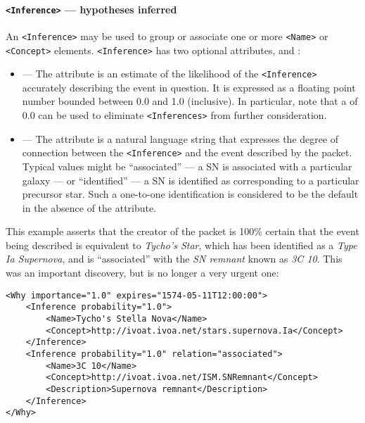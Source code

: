 \documentclass[11pt,a4paper]{ivoa}
\begin{document}
\paragraph{\texttt{<Inference>} --- hypotheses inferred}\label{sec:3.6.6}
An \verb|<Inference>| may be used to group or associate one or more \verb|<Name>|
or \verb|<Concept>| elements. \verb|<Inference>| has two optional
attributes,  and :
\begin{itemize}
\item {}\label{sec:3.6.6.1} --- The
 attribute is an estimate of the likelihood of the \verb|<Inference>|
accurately describing the event in question. It is expressed as a floating point
number bounded between 0.0 and 1.0 (inclusive). In particular, note that
a  of 0.0 can be used to eliminate \verb|<Inferences>| from further
consideration.
\item {}\label{sec:3.6.6.2} --- The 
attribute is a natural language string that expresses the degree of connection
between the \verb|<Inference>| and the event described by the packet. Typical
values might be ``associated'' --- a SN is associated with a particular galaxy
--- or ``identified'' --- a SN is identified as corresponding to a particular
precursor star. Such a one-to-one identification is considered to be the default
 in the absence of the attribute.
\end{itemize}

This example asserts that the creator of the packet is 100\% certain that the
event being described is equivalent to \emph{Tycho's Star}, which has been
identified as a \emph{Type Ia Supernova}, and is ``associated'' with the
\emph{SN remnant} known as \emph{3C 10}. This was an important discovery, but
is no longer a very urgent one:
\begin{lstlisting}
<Why importance="1.0" expires="1574-05-11T12:00:00">
    <Inference probability="1.0">
        <Name>Tycho's Stella Nova</Name>
        <Concept>http://ivoat.ivoa.net/stars.supernova.Ia</Concept>
    </Inference>
    <Inference probability="1.0" relation="associated">
        <Name>3C 10</Name>
        <Concept>http://ivoat.ivoa.net/ISM.SNRemnant</Concept>
        <Description>Supernova remnant</Description>
    </Inference>
</Why>
\end{lstlisting}
\end{document}
